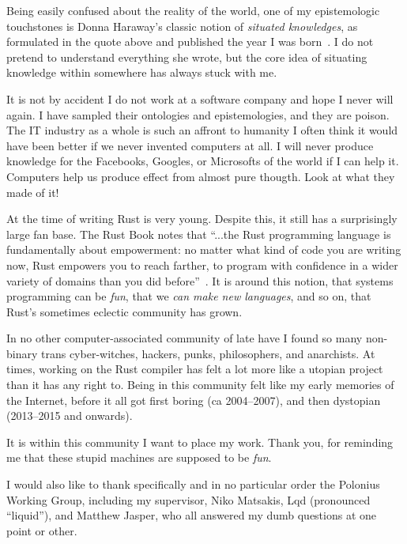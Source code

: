 \documentclass[11pt,a4paper,twoside,openany]{report}
\begin{document}
{\footnotesize

  Being easily confused about the reality of the world, one of my
  epistemologic touchstones is Donna Haraway's classic notion of
  \textit{situated knowledges}, as formulated in the quote above and published
  the year I was born~\cite{haraway}. I do not pretend to understand everything
  she wrote, but the core idea of situating knowledge within somewhere has
  always stuck with me.

It is not by accident I do not work at a software company and hope I never will
again. I have sampled their ontologies and epistemologies, and they are poison.
The IT industry as a whole is such an affront to humanity I often think it would
have been better if we never invented computers at all. I will never produce
knowledge for the Facebooks, Googles, or Microsofts of the world if I can help
it. Computers help us produce effect from almost pure thougth. Look at what they
made of it!

At the time of writing Rust is very young. Despite this, it still has a
surprisingly large fan base. The Rust Book notes that ``...the Rust programming
language is fundamentally about empowerment: no matter what kind of code you are
writing now, Rust empowers you to reach farther, to program with confidence in a
wider variety of domains than you did before''~\cite{nichols_rust_nodate}. It
is around this notion, that systems programming can be \emph{fun}, that we
\emph{can make new languages}, and so on, that Rust's sometimes eclectic
community has grown.

In no other computer-associated community of late have I found so many
non-binary trans cyber-witches, hackers, punks, philosophers, and anarchists. At
times, working on the Rust compiler has felt a lot more like a utopian project
than it has any right to. Being in this community felt like my early memories of
the Internet, before it all got first boring (ca 2004--2007), and then dystopian
(2013--2015 and onwards).

It is within this community I want to place my work. Thank you, for reminding me
that these stupid machines are supposed to be \emph{fun}.

I would also like to thank specifically and in no particular order the Polonius
Working Group, including my supervisor, Niko Matsakis, Lqd (pronounced
``liquid''), and Matthew Jasper, who all answered my dumb questions at one point
or other.

}
\end{document}
